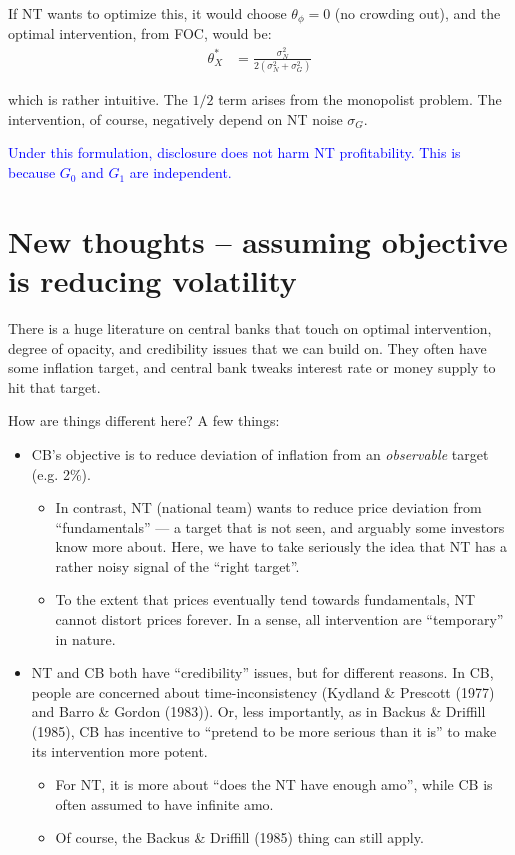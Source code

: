 \documentclass[12pt]{article}
\begin{document}
If NT wants to optimize this, it would choose $\theta_\phi = 0$ (no crowding out), and the optimal intervention, from FOC, would be:
\begin{align*}
    \theta_X^* & = \frac{\sigma_N^2}{2 (\sigma_N^2 + \sigma_G^2)}
\end{align*}

\noindent which is rather intuitive. The $1/2$ term arises from the monopolist problem. The intervention, of course, negatively depend on NT noise $\sigma_G$. 


\textcolor{blue}{Under this formulation, disclosure does not harm NT profitability. This is because $G_0$ and $G_1$ are independent. }



\newpage
\section{New thoughts -- assuming objective is reducing volatility}

There is a huge literature on central banks that touch on optimal intervention, degree of opacity, and credibility issues that we can build on. They often have some inflation target, and central bank tweaks interest rate or money supply to hit that target. 

How are things different here? A few things:
\begin{itemize}
    \item CB's objective is to reduce deviation of inflation from an \textit{observable} target (e.g. 2\%). 
    \begin{itemize}
        \item In contrast, NT (national team) wants to reduce price deviation from ``fundamentals'' --- a target that is not seen, and arguably some investors know more about. Here, we have to take seriously the idea that NT has a rather noisy signal of the ``right target''. 
        \item To the extent that prices eventually tend towards fundamentals, NT cannot distort prices forever. In a sense, all intervention are ``temporary'' in nature. 
    \end{itemize}

    \item NT and CB both have ``credibility'' issues, but for different reasons. In CB, people are concerned about time-inconsistency (Kydland \& Prescott (1977) and Barro \& Gordon (1983)). Or, less importantly, as in Backus \& Driffill (1985), CB has incentive to ``pretend to be more serious than it is'' to make its intervention more potent. 
    \begin{itemize}
        \item For NT, it is more about ``does the NT have enough amo'', while CB is often assumed to have infinite amo. 
        \item Of course, the Backus \& Driffill (1985) thing can still apply. 
    \end{itemize}
\end{itemize}
\end{document}
